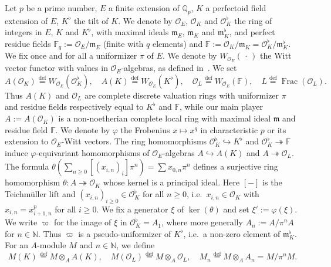 \documentclass[11pt]{article}
\theoremstyle{definition}
\numberwithin{equation}{section}
\numberwithin{figure}{section}
\numberwithin{table}{section}
\DeclareMathOperator{\Frac}{Frac}
\newcommand{\eqd}{\stackrel{\mathrm{def}}{=}}
\begin{document}
Let $p$ be a prime number, $E$ a finite extension of $\mathbb{Q}_{p}$, $K$ a perfectoid field extension of $E$, $K^{\flat}$ the tilt of $K$. We denote by $\mathcal{O}_{E}$, $\mathcal{O}_{K}$ and $\mathcal{O}_{K}^{\flat}$ the ring of integers in $E$, $K$ and $K^{\flat}$, with maximal ideals $\mathfrak{m}_{E}$, $\mathfrak{m}_{K}$ and $\mathfrak{m}_{K}^{\flat}$, and perfect residue fields $\mathbb{F}_{q}:=\mathcal{O}_{E}/\mathfrak{m}_{E}$ (finite with $q$ elements) and $\mathbb{F}:=\mathcal{O}_{K}/\mathfrak{m}_{K}=\mathcal{O}_{K}^{\flat}/\mathfrak{m}_{K}^{\flat}$. We fix once and for all a uniformizer $\pi$ of $E$. We denote by $W_{\mathcal{O}_{E}}({\,\cdot\,})$ the Witt vector functor with values in $\mathcal{O}_{E}$-algebras, as defined in~\cite[1.2]{FaFo15}. We set
\[
A(\mathcal{O}_{K})\eqd W_{\mathcal{O}_{E}}(\mathcal{O}_{K}^{\flat}),\quad A(K)\eqd W_{\mathcal{O}_{E}}(K^{\flat}),\quad\mathcal{O}_{L}\eqd W_{\mathcal{O}_{E}}(\mathbb{F}),\quad L\eqd\Frac(\mathcal{O}_{L}).
\]
Thus $A(K)$ and $\mathcal{O}_{L}$ are complete discrete valuation rings with uniformizer $\pi$ and residue fields respectively equal to $K^{\flat}$ and $\mathbb{F}$, while our main player $A:=A(\mathcal{O}_{K})$ is a non-noetherian complete local ring with maximal ideal $\mathfrak{m}$ and residue field $\mathbb{F}$. We denote by $\varphi$ the Frobenius $x\mapsto x^{q}$ in characteristic $p$ or its extension to $\mathcal{O}_{E}$-Witt vectors. The ring homomorphisms $\mathcal{O}_{K}^{\flat}\hookrightarrow K^{\flat}$ and $\mathcal{O}_{K}^{\flat}\twoheadrightarrow\mathbb{F}$ induce $\varphi$-equivariant homomorphisms of $\mathcal{O}_{E}$-algebras $A\hookrightarrow A(K)$ and $A\twoheadrightarrow\mathcal{O}_{L}$. The formula $\theta(\sum_{n\geq0}[(x_{i,n})_{i}]\pi^{n})=\sum x_{0,n}\pi^{n}$ defines a surjective ring homomorphism $\theta:A\twoheadrightarrow\mathcal{O}_{K}$ whose kernel is a principal ideal. Here $[-]$ is the Teichm\"uller lift and $(x_{i,n})_{i\geq0}\in\mathcal{O}_{K}^{\flat}$ for all $n\geq0$, i.e.~$x_{i,n}\in\mathcal{O}_{K}$ with $x_{i,n}=x_{i+1,n}^{p}$ for all $i\geq0$. We fix a generator $\xi$ of $\ker(\theta)$ and set $\xi':=\varphi(\xi)$. We write $\varpi$ for the image of $\xi$ in $\mathcal{O}_{K}^{\flat}=A_{1}$, where more generally $A_{n}:=A/\pi^{n}A$ for $n\in\mathbb{N}$. Thus $\varpi$ is a pseudo-uniformizer of $K^{\flat}$, i.e.~a non-zero element of $\mathfrak{m}_{K}^{\flat}$. For an $A$-module $M$ and $n\in\mathbb{N}$, we define\emph{ }
\[
M(K)\eqd M\otimes_{A}A(K),\quad M(\mathcal{O}_{L})\eqd M\otimes_{A}\mathcal{O}_{L},\quad M_{n}\eqd M\otimes_{A}A_{n}=M/\pi^{n}M.
\]
\end{document}
